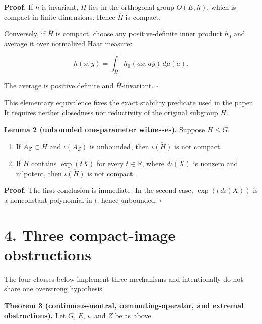 \documentclass[
  10pt,
  letterpaper,
  oneside]{scrartcl}
\providecommand{\tightlist}{%
  \setlength{\itemsep}{0pt}\setlength{\parskip}{0pt}}
\begin{document}
\textbf{Proof.} If \(h\) is invariant, \(H\) lies in the orthogonal
group \(O(E,h)\), which is compact in finite dimensions. Hence
\(\overline H\) is compact.

Conversely, if \(\overline H\) is compact, choose any positive-definite
inner product \(h_0\) and average it over normalized Haar measure:

\[
h(x,y)=\int_{\overline H}h_0(ax,ay)\,d\mu(a).
\]

The average is positive definite and \(\overline H\)-invariant.
\(\square\)

This elementary equivalence fixes the exact stability predicate used in
the paper. It requires neither closedness nor reductivity of the
original subgroup \(H\).

\textbf{Lemma 2 (unbounded one-parameter witnesses).} Suppose
\(H\leq G\).

\begin{enumerate}
\def\labelenumi{\arabic{enumi}.}
\tightlist
\item
  If \(A_Z\subset H\) and \(\iota(A_Z)\) is unbounded, then
  \(\overline{\iota(H)}\) is not compact.
\item
  If \(H\) contains \(\exp(tX)\) for every \(t\in\mathbb R\), where
  \(d\iota(X)\) is nonzero and nilpotent, then \(\overline{\iota(H)}\)
  is not compact.
\end{enumerate}

\textbf{Proof.} The first conclusion is immediate. In the second case,
\(\exp(t\,d\iota(X))\) is a nonconstant polynomial in \(t\), hence
unbounded. \(\square\)

\section{4. Three compact-image
obstructions}\label{three-compact-image-obstructions}

The four clauses below implement three mechanisms and intentionally do
not share one overstrong hypothesis.

\textbf{Theorem 3 (continuous-neutral, commuting-operator, and extremal
obstructions).} Let \(G\), \(E\), \(\iota\), and \(Z\) be as above.
\end{document}
